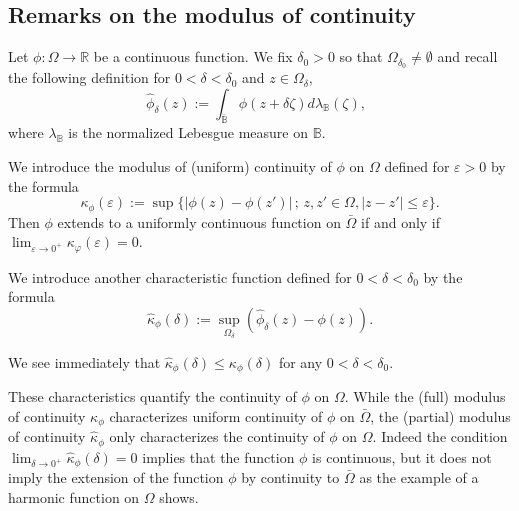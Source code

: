 \documentclass[12pt]{amsart}
\theoremstyle{definition}
\numberwithin{theorem}{section}
\numberwithin{equation}{section}
\newcommand{\B}{\mathbb{B}}
\newcommand{\R}{\mathbb{R}}
\begin{document}
\subsection{Remarks on the modulus of continuity}


 Let  $\phi : {\Omega} \longrightarrow \R$ be a continuous function.  We fix $\delta_0 > 0$ so that $\Omega_{\delta_0} \neq \emptyset$ and recall the following definition for $0 < \delta < \delta_0$ and $z \in \Omega_\delta$,
\begin{equation} \label{eq:supnorm}
\widehat{\phi}_\delta  (z) := \int_{\bar{\B}} \phi (z + \delta \zeta) d \lambda_\B (\zeta),  \, \, \, 
\end{equation}
where $\lambda_\B$ is the normalized Lebesgue measure on $\B$.

 We introduce the  modulus of (uniform)  continuity of $\phi$ on ${\Omega}$ defined for $\varepsilon> 0$ by the formula
  \begin{equation} \label{eq:fullkappa}
  \kappa_\phi (\varepsilon) := \sup \{\vert \phi(z) - \phi (z')\vert \, ; \, z, z' \in {\Omega}, \vert z-z'\vert \leq \varepsilon\}.
  \end{equation}
  Then $\phi$ extends to a uniformly continuous function on $\bar{\Omega}$ if and only if $\lim_{\varepsilon \to 0^+} \kappa_\varphi (\varepsilon) = 0$.
  
We introduce another  characteristic function defined  for $0 < \delta < \delta_0$ by the formula
\begin{equation} \label{eq:hatkappa}
\widehat{\kappa}_\phi (\delta) := \sup_{\Omega_\delta} \left(\widehat{\phi}_\delta (z) - \phi (z)\right).
\end{equation}

We see immediately that $\widehat{\kappa}_\phi (\delta) \leq  \kappa_\phi (\delta)$ for any $0< \delta < \delta_0$. 

These  characteristics quantify the continuity of $\phi$ on $\Omega$. While the (full) modulus of  continuity $ \kappa_\phi$ characterizes uniform continuity of $\phi$ on $\bar{\Omega}$, the (partial) modulus of continuity $\widehat{\kappa}_\phi$ only characterizes the continuity of $\phi$ on $\Omega$. Indeed  the condition $\lim_{\delta \to 0^+} \widehat{\kappa}_\phi (\delta) = 0$  implies that the function $\phi$ is continuous, but it does not imply the extension of the function $\phi$ by continuity to $\bar{\Omega}$ as the example of a harmonic function on $\Omega$ shows. 
\end{document}
